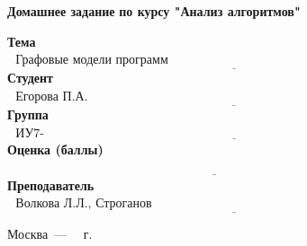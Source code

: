 \begin{titlepage}
	
	\begin{center}
		\Large\textbf{Домашнее задание}\newline
		\Large\textbf {по курсу "Анализ алгоритмов"}\newline
	\end{center}
	
	\noindent\textbf{Тема} $\underline{\text{~~Графовые модели программ ~~~~~~~~~~~~~~~~~~~~~~~~~~~~~~~~~~~~~~~~~~~~~~~~~~~~~~~~~~~~~~~~~~~~~~~~}}$\newline\newline\newline
	\noindent\textbf{Студент} $\underline{\text{~~Егорова П.А.~~~~~~~~~~~~~~~~~~~~~~~~~~~~~~~~~~~~~~~~~~~~~~~~~~~~~~~~~~~~~~~~~~~~~~~~~~~~~~~~~~~~~~~~~}}$\newline\newline
	\noindent\textbf{Группа} $\underline{\text{~~ИУ7-54Б~~~~~~~~~~~~~~~~~~~~~~~~~~~~~~~~~~~~~~~~~~~~~~~~~~~~~~~~~~~~~~~~~~~~~~~~~~~~~~~~~~~~~~~~~~~~~~~~~}}$\newline\newline
	\noindent\textbf{Оценка (баллы)} $\underline{\text{~~~~~~~~~~~~~~~~~~~~~~~~~~~~~~~~~~~~~~~~~~~~~~~~~~~~~~~~~~~~~~~~~~~~~~~~~~~~~~~~~~~~~~~~~~~~~~~~~~~}}$\newline\newline
	\noindent\textbf{Преподаватель} $\underline{\text{~~Волкова Л.Л., Строганов Ю.В.~~~~~~~~~~~~~~~~~~~~~~~~~~~~~~~~~~~~~~~~~~~~~~~~~~~~~~~~~~~~~~~~~~~~~~~~~~~~~~}}$\newline
	
	\begin{center}
		\vfill
		Москва~---~\the\year
		~г.
	\end{center}
	\restoregeometry
\end{titlepage}

